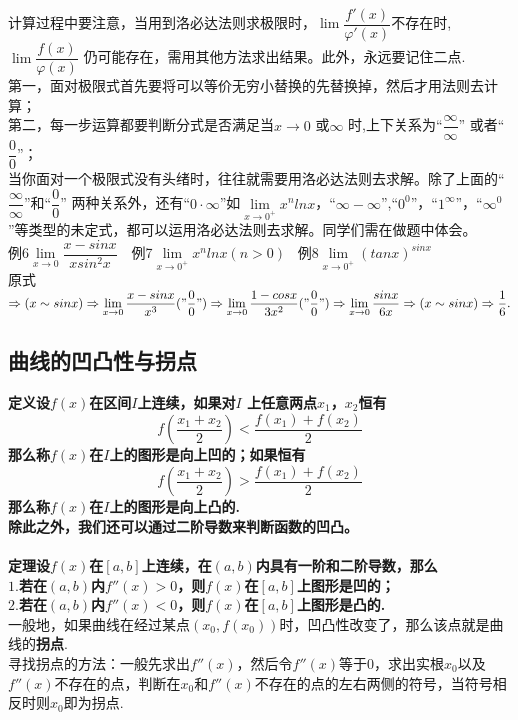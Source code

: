 \documentclass[UTF8]{ctexart}
\begin{document}
计算过程中要注意，当用到洛必达法则求极限时，$\lim \dfrac {f'(x)}{\varphi'(x)}$不存在时,$\lim \dfrac {f(x)}{\varphi(x)}$ 仍可能存在，需用其他方法求出结果。此外，永远要记住二点.\\第一，面对极限式首先要将可以等价无穷小替换的先替换掉，然后才用法则去计算；\\第二，每一步运算都要判断分式是否满足当$x \rightarrow 0$ 或$\infty$ 时,上下关系为“$\dfrac{\infty}{\infty}$” 或者“$\dfrac{0}{0}$”；\\当你面对一个极限式没有头绪时，往往就需要用洛必达法则去求解。除了上面的“$\dfrac{\infty}{\infty}$”和“$\dfrac{0}{0}$” 两种关系外，还有“$0\cdot \infty$”如$\lim\limits_{x \to 0^+} x^nlnx$，“$\infty-\infty$”,“$0^0$”，“$1^\infty$”，“$\infty^0$”等类型的未定式，都可以运用洛必达法则去求解。同学们需在做题中体会。
\\例6\quad $\lim\limits_{x \to 0} \dfrac{x-sinx}{xsin^2x}$\quad\ \quad\ 例7\quad$\lim\limits_{x \to 0^+}x^nlnx(n>0)$
\quad\ 例8\quad $\lim\limits_{x \to 0^+}(tanx)^{sinx}$
\\原式$\Rightarrow(x\sim sinx)\Rightarrow\lim\limits_{x \to 0} \dfrac{x-sinx}{x^3}("\dfrac{0}{0}")\Rightarrow\lim\limits_{x \to 0} \dfrac{1-cosx}{3x^2}("\dfrac{0}{0}")\Rightarrow\lim\limits_{x \to 0} \dfrac{sinx}{6x}\Rightarrow(x\sim sinx)\Rightarrow\dfrac{1}{6}.$
\vspace{-4mm} \subsection{曲线的凹凸性与拐点}  \vspace{-2mm} \small \textbf{定义\quad 设$f(x)$在区间$I$上连续，如果对$I$ 上任意两点$x_1$，$x_2$恒有$$f(\frac{x_1+x_2}{2})<\frac{f(x_1)+f(x_2)}{2}$$
那么称$f(x)$在$I$上的图形是向上凹的；如果恒有$$f(\frac{x_1+x_2}{2})>\frac{f(x_1)+f(x_2)}{2}$$
那么称$f(x)$在$I$上的图形是向上凸的.
\\除此之外，我们还可以通过二阶导数来判断函数的凹凸。\\
\\定理\quad 设$f(x)$在$[a,b]$上连续，在$(a,b)$内具有一阶和二阶导数，那么
\\$1.$若在$(a,b)$内$f''(x)>0$，则$f(x)$在$[a,b]$上图形是凹的；
\\$2.$若在$(a,b)$内$f''(x)<0$，则$f(x)$在$[a,b]$上图形是凸的.}
\\ 一般地，如果曲线在经过某点$(x_0,f(x_0))$时，凹凸性改变了，那么该点就是曲线的\textbf{拐点}.
\\ 寻找拐点的方法：一般先求出$f''(x)$，然后令$f''(x)$等于0，求出实根$x_0$以及$f''(x)$不存在的点，判断在$x_0$和$f''(x)$不存在的点的左右两侧的符号，当符号相反时则$x_0$即为拐点.
\end{document}
